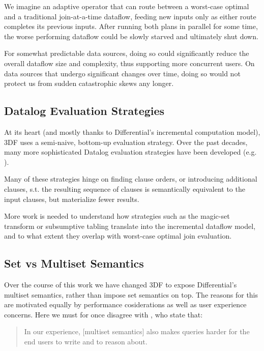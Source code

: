 \documentclass[../index.tex]{subfiles}
\begin{document}
We imagine an adaptive operator that can route between a worst-case
optimal and a traditional join-at-a-time dataflow, feeding new inputs
only as either route completes its previous inputs. After running both
plans in parallel for some time, the worse performing dataflow could
be slowly starved and ultimately shut down.

For somewhat predictable data sources, doing so could significantly
reduce the overall dataflow size and complexity, thus supporting more
concurrent users. On data sources that undergo significant changes
over time, doing so would not protect us from sudden catastrophic
skews any longer.

\subsection{Datalog Evaluation Strategies}

At its heart (and mostly thanks to Differential's incremental
computation model), 3DF uses a semi-naive, bottom-up evaluation
strategy. Over the past decades, many more sophisticated Datalog
evaluation strategies have been developed (e.g. \cite{tekle2011more}).

Many of these strategies hinge on finding clause orders, or
introducing additional clauses, s.t. the resulting sequence of clauses
is semantically equivalent to the input clauses, but materialize fewer
results.

More work is needed to understand how strategies such as the magic-set
transform or subsumptive tabling translate into the incremental
dataflow model, and to what extent they overlap with worst-case
optimal join evaluation.

\subsection{Set vs Multiset Semantics} \label{set-vs-multiset}

Over the course of this work we have changed 3DF to expose
Differential's multiset semantics, rather than impose set semantics on
top. The reasons for this are motivated equally by performance
cosiderations as well as user experience concerns. Here we must for
once disagree with \cite{aref2015design}, who state that:

\begin{quote}
  In our experience, [multiset semantics] also makes queries harder
  for the end users to write and to reason about.
\end{quote}
\end{document}
